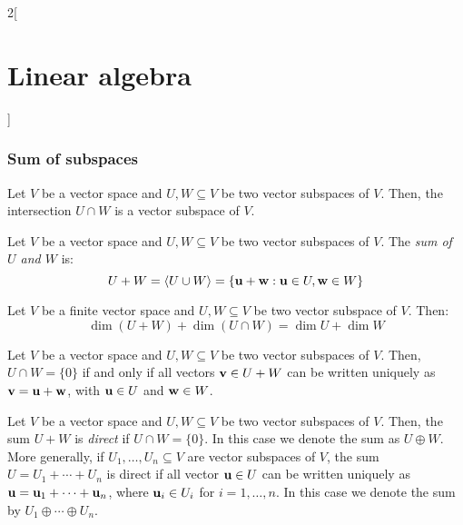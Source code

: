 \documentclass[../../../main.tex]{subfiles}
\begin{document}
\begin{multicols}{2}[\section{Linear algebra}]
  \subsubsection*{Sum of subspaces}
  \begin{lemma}
    Let $V$ be a vector space and $U,W\subseteq V$ be two vector subspaces of $V$. Then, the intersection $U\cap W$ is a vector subspace of $V$.
  \end{lemma}
  \begin{definition}
    Let $V$ be a vector space and $U,W\subseteq V$ be two vector subspaces of $V$. The \textit{sum of $U$ and $W$} is: $$U+W=\langle U\cup W\rangle=\{\vb{u}+\vb{w}: \vb{u}\in U,\vb{w}\in W\}$$
  \end{definition}
  \begin{prop}
    Let $V$ be a finite vector space and $U,W\subseteq V$ be two vector subspace of $V$. Then: $$\dim (U+W)+\dim(U\cap W)=\dim U+\dim W$$
  \end{prop}
  \begin{lemma}
    Let $V$ be a vector space and $U,W\subseteq V$ be two vector subspaces of $V$. Then, $U\cap W=\{0\}$ if and only if all vectors $\vb{v}\in U+W$ can be written uniquely as $\vb{v}=\vb{u}+\vb{w}$, with $\vb{u}\in U$ and $\vb{w}\in W$.
  \end{lemma}
  \begin{definition}
    Let $V$ be a vector space and $U,W\subseteq V$ be two vector subspaces of $V$. Then, the sum $U+W$ is \textit{direct} if $U\cap W=\{0\}$. In this case we denote the sum as $U\oplus W$. More generally, if $U_1,\ldots,U_n\subseteq V$ are vector subspaces of $V$, the sum $U=U_1+\cdots+U_n$ is direct if all vector $\vb{u}\in U$ can be written uniquely as $\vb{u}=\vb{u}_1+\cdots+\vb{u}_n$, where $\vb{u}_i\in U_i$ for $i=1,\ldots,n$. In this case we denote the sum by $U_1\oplus\cdots\oplus U_n$.
  \end{definition}

\end{multicols}
\end{document}
